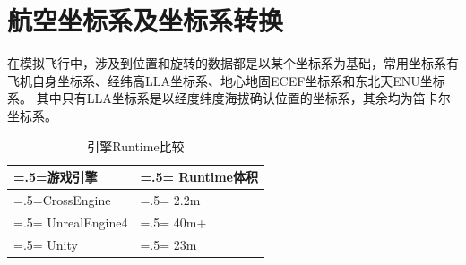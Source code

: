 
\section{航空坐标系及坐标系转换}
在模拟飞行中，涉及到位置和旋转的数据都是以某个坐标系为基础，常用坐标系有飞机自身坐标系、经纬高LLA坐标系、地心地固ECEF坐标系和东北天ENU坐标系。
其中只有LLA坐标系是以经度纬度海拔确认位置的坐标系，其余均为笛卡尔坐标系。
\begin{table}[h!]
    \begin{center}
        \caption{引擎Runtime比较}
        \label{enginert}
        \renewcommand\arraystretch{1.5}
        \begin{tabularx}{0.8\textwidth}{ 
            | >{\centering\arraybackslash\hsize=.5\hsize\linewidth=\hsize}X 
            | >{\centering\arraybackslash\hsize=.5\hsize\linewidth=\hsize}X 
            | }
            \hline
            \textbf{游戏引擎} & \textbf{Runtime体积} \\
            \hline
            CrossEngine & 2.2m \\
            \hline
            UnrealEngine4 & 40m+\\
            \hline
            Unity & 23m\\
            \hline
        \end{tabularx}
    \end{center}
\end{table}
